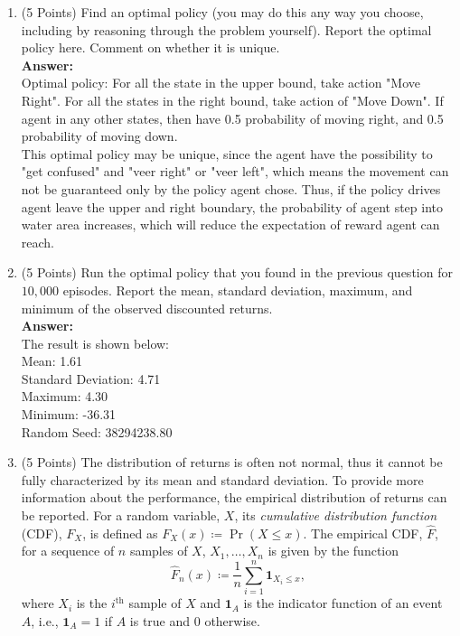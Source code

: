 \documentclass[]{article}
\begin{document}
\begin{enumerate}[label=\Alph*]
    \item (5 Points) Find an optimal policy (you may do this any way you choose, including by reasoning through the problem yourself). Report the optimal policy here. Comment on whether it is unique. \\
    \textbf{Answer: }\\
    Optimal policy: For all the state in the upper bound, take action "Move Right". For all the states in the right bound, take action of "Move Down". If agent in any other states, then have 0.5 probability of moving right, and 0.5 probability of moving down. \\
    This optimal policy may be unique, since the agent have the possibility to "get confused" and "veer right" or "veer left", which means the movement can not be guaranteed only by the policy agent chose. Thus, if the policy drives agent leave the upper and right boundary, the probability of agent step into water area increases, which will reduce the expectation of reward agent can reach. 
    \item (5 Points) Run the optimal policy that you found in the previous question for $10,\!000$ episodes. Report the mean, standard deviation, maximum, and minimum of the observed discounted returns.\\
    \textbf{Answer: }\\
    The result is shown below:\\
        Mean: 1.61\\
        Standard Deviation: 4.71\\
        Maximum: 4.30\\
        Minimum: -36.31\\
        Random Seed: 38294238.80

    \item (5 Points) The distribution of returns is often not normal, thus it cannot be fully characterized by its mean and standard deviation. To provide more information about the performance, the empirical distribution of returns can be reported.
    For a random variable, $X$, its \textit{cumulative distribution function} (CDF), $F_X$, is defined as $F_X(x) \coloneqq \Pr(X \le x)$. The empirical CDF, $\hat F$, for a sequence of $n$ samples of $X$, $X_1,\dotsc,X_n$ is given by the function
    \begin{equation*}
        \hat F_n(x) \coloneqq \frac{1}{n} \sum_{i=1}^n \mathbf{1}_{X_i \le x},
    \end{equation*}
    where $X_i$ is the $i^\text{th}$ sample of $X$ and $\mathbf{1}_A$ is the indicator function of an event $A$, i.e., $\mathbf{1}_A=1$ if $A$ is true and $0$ otherwise. 
    

\end{enumerate}
\end{document}
